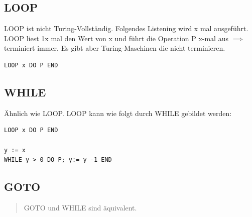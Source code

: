 \documentclass[11pt,twoside,landscape]{article}
\begin{document}
\begin{multicols}{3}
\subsection{LOOP}
\label{sec:org8e55d7a}
LOOP ist nicht Turing-Vollständig. Folgendes Listening wird x mal ausgeführt. LOOP liest 1x mal den Wert von x und führt die Operation P x-mal aus \(\implies\) terminiert immer. Es gibt aber Turing-Maschinen die nicht terminieren.
\begin{verbatim}
LOOP x DO P END
\end{verbatim}

\subsection{WHILE}
\label{sec:org6ca09de}
Ähnlich wie LOOP. LOOP kann wie folgt durch WHILE gebildet werden:
\begin{verbatim}
LOOP x DO P END

y := x
WHILE y > 0 DO P; y:= y -1 END
\end{verbatim}

\subsection{GOTO}
\label{sec:org09d3fa4}
\begin{quote}
GOTO und WHILE sind äquivalent.
\end{quote}


\end{multicols}
\newpage
\end{document}
